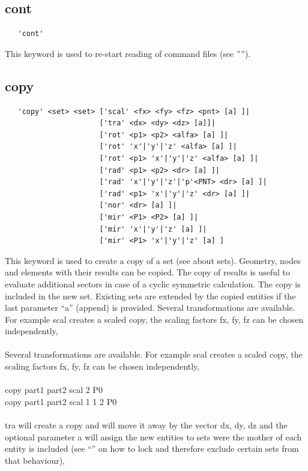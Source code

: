 \documentclass{article}
\begin{document}
\subsection{\label{cont}cont}
\begin{verbatim}
   'cont'
\end{verbatim}
This keyword is used to re-start reading of command files (see '''').

\subsection{\label{copy}copy}
\begin{verbatim}
   'copy' <set> <set> ['scal' <fx> <fy> <fz> <pnt> [a] ]|
                      ['tra' <dx> <dy> <dz> [a]]|
                      ['rot' <p1> <p2> <alfa> [a] ]|
                      ['rot' 'x'|'y'|'z' <alfa> [a] ]|
                      ['rot' <p1> 'x'|'y'|'z' <alfa> [a] ]|
                      ['rad' <p1> <p2> <dr> [a] ]|
                      ['rad' 'x'|'y'|'z'|'p'<PNT> <dr> [a] ]|
                      ['rad' <p1> 'x'|'y'|'z' <dr> [a] ]|
                      ['nor' <dr> [a] ]|
                      ['mir' <P1> <P2> [a] ]| 
                      ['mir' 'x'|'y'|'z' [a] ]| 
                      ['mir' <P1> 'x'|'y'|'z' [a] ] 
\end{verbatim}
This keyword is used to create a copy of a set (see  about sets). Geometry, nodes and elements with their results can be copied. The copy of results is useful to evaluate additional sectors in case of a cyclic symmetric calculation. The copy is included in the new set. Existing sets are extended by the copied entities if the last parameter ``a'' (append) is provided. Several transformations are available. For example scal creates a scaled copy, the scaling factors fx, fy, fz can be chosen independently,\\\\
Several transformations are available. For example scal creates a scaled copy, the scaling factors fx, fy, fz can be chosen independently,\\\\
copy part1 part2 scal 2 P0 \\
copy part1 part2 scal 1 1 2 P0\\\\
tra will create a copy and will move it away by the vector dx, dy, dz and the optional parameter a will assign the new entities to sets were the mother of each entity is included (see ``'' on how to lock and therefore exclude certain sets from that behaviour),\\\\
\end{document}
